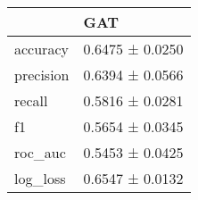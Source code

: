 \begin{tabular}{ll}
\toprule
 & GAT \\
\midrule
accuracy & 0.6475 ± 0.0250 \\
precision & 0.6394 ± 0.0566 \\
recall & 0.5816 ± 0.0281 \\
f1 & 0.5654 ± 0.0345 \\
roc_auc & 0.5453 ± 0.0425 \\
log_loss & 0.6547 ± 0.0132 \\
\bottomrule
\end{tabular}
